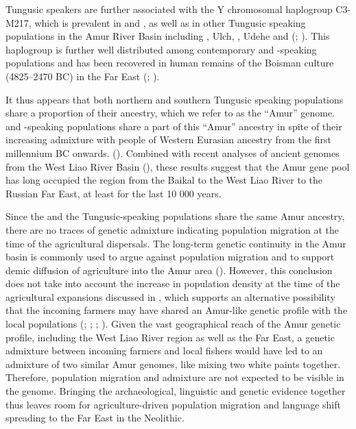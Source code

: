 \documentclass[output=paper,colorlinks,citecolor=brown]{langscibook}
\begin{document}
 Tungusic speakers are further associated with the Y chromosomal haplogroup C3-M217, which is prevalent in  and , as well as in other Tungusic speaking populations in the Amur River Basin including , Ulch, , Udehe and  (\citealt{Malyarchuk2010}; \citealt{Duggan2013}). This haplogroup is further well distributed among contemporary  and -speaking populations and has been recovered in human remains of the Boisman culture (4825–2470 BC) in the  Far East (\citealt{Yanetal2014}; \citealt{Wang2021}).
 
It thus appears that both northern and southern Tungusic speaking populations share a proportion of their ancestry, which we refer to as the “Amur” genome.  and -speaking populations share a part of this “Amur” ancestry in spite of their increasing admixture with people of Western Eurasian ancestry from the first millennium BC onwards. (\citealt{Jeong2018, Jeong2019}). Combined with recent analyses of ancient genomes from the West Liao River Basin (\citealt{Ning2020}), these results suggest that the Amur gene pool has long occupied the region from the Baikal to the West Liao River to the Russian Far East, at least for the last 10 000 years.

Since the  and the Tungusic-speaking populations share the same Amur ancestry, there are no traces of genetic admixture indicating population migration at the time of the agricultural dispersals. The long-term genetic continuity in the Amur basin is commonly used to argue against population migration and to support demic diffusion of agriculture into the Amur area (\citealt{Siska2017}). However, this conclusion does not take into account the increase in population density at the time of the agricultural expansions discussed in , which supports an alternative possibility that the incoming farmers may have shared an Amur-like genetic profile with the local populations (\citealt{Cui2020}; \citealt{WangRobbeets2020}; \citealt{Jeong2020}; \citealt{Li2020}). Given the vast geographical reach of the Amur genetic profile, including the West Liao River region as well as the  Far East, a genetic admixture between  incoming farmers and  local fishers would have led to an admixture of two similar Amur genomes, like mixing two white paints together. Therefore, population migration and admixture are not expected to be visible in the genome. Bringing the archaeological, linguistic and genetic evidence together thus leaves room for agriculture-driven population migration and language shift spreading  to the  Far East in the Neolithic. 
\end{document}
